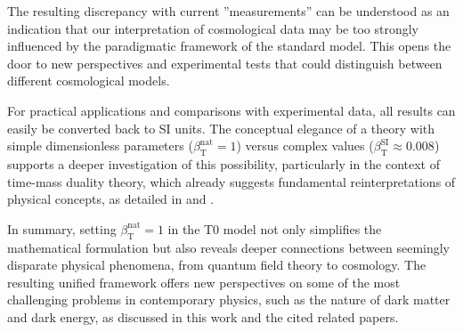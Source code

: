 \documentclass[12pt,a4paper]{article}
\newcommand{\betaT}{\beta_{\text{T}}}
\begin{document}
	The resulting discrepancy with current ''measurements'' can be understood as an indication that our interpretation of cosmological data may be too strongly influenced by the paradigmatic framework of the standard model. This opens the door to new perspectives and experimental tests that could distinguish between different cosmological models.
	
	For practical applications and comparisons with experimental data, all results can easily be converted back to SI units. The conceptual elegance of a theory with simple dimensionless parameters (\(\betaT^{\text{nat}} = 1\)) versus complex values (\(\betaT^{\text{SI}} \approx 0.008\)) supports a deeper investigation of this possibility, particularly in the context of time-mass duality theory, which already suggests fundamental reinterpretations of physical concepts, as detailed in \cite{pascher_zeit_masse_2025} and \cite{pascher_alphabeta_2025}.
	
	In summary, setting \(\betaT^{\text{nat}} = 1\) in the T0 model not only simplifies the mathematical formulation but also reveals deeper connections between seemingly disparate physical phenomena, from quantum field theory to cosmology. The resulting unified framework offers new perspectives on some of the most challenging problems in contemporary physics, such as the nature of dark matter and dark energy, as discussed in this work and the cited related papers.
	
\end{document}
